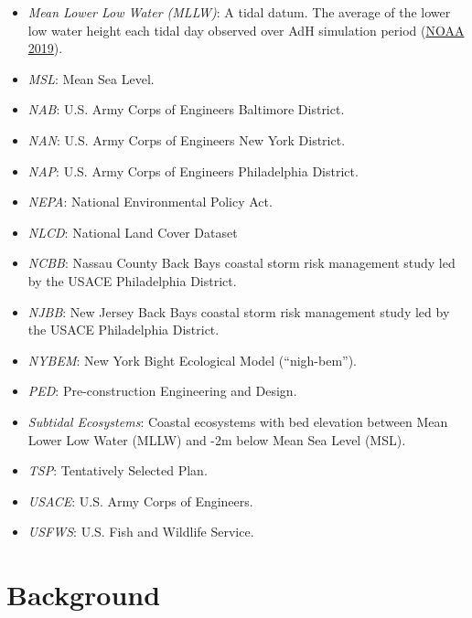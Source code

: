 \documentclass[
]{book}
\begin{document}
\begin{itemize}
\item
  \emph{Mean Lower Low Water (MLLW)}: A tidal datum. The average of the lower low water height each tidal day observed over AdH simulation period (\href{https://shoreline.noaa.gov/glossary.html}{NOAA 2019}).
\item
  \emph{MSL}: Mean Sea Level.
\item
  \emph{NAB}: U.S. Army Corps of Engineers Baltimore District.\\
\item
  \emph{NAN}: U.S. Army Corps of Engineers New York District.\\
\item
  \emph{NAP}: U.S. Army Corps of Engineers Philadelphia District.\\
\item
  \emph{NEPA}: National Environmental Policy Act.
\item
  \emph{NLCD}: National Land Cover Dataset\\
\item
  \emph{NCBB}: Nassau County Back Bays coastal storm risk management study led by the USACE Philadelphia District.\\
\item
  \emph{NJBB}: New Jersey Back Bays coastal storm risk management study led by the USACE Philadelphia District.\\
\item
  \emph{NYBEM}: New York Bight Ecological Model (``nigh-bem'').\\
\item
  \emph{PED}: Pre-construction Engineering and Design.
\item
  \emph{Subtidal Ecosystems}: Coastal ecosystems with bed elevation between Mean Lower Low Water (MLLW) and -2m below Mean Sea Level (MSL).
\item
  \emph{TSP}: Tentatively Selected Plan.
\item
  \emph{USACE}: U.S. Army Corps of Engineers.\\
\item
  \emph{USFWS}: U.S. Fish and Wildlife Service.
\end{itemize}

\hypertarget{background}{%
\chapter{Background}\label{background}}
\end{document}
